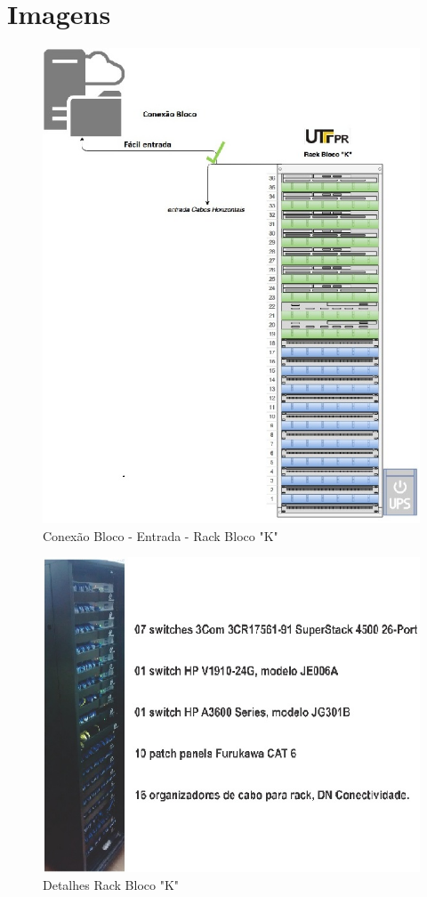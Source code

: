 \documentclass[	DIV=calc,%
							paper=a4,%
							fontsize=12pt,%
							onecolumn]{scrartcl}	 					%
\begin{document}
\section{Imagens}
\begin{figure}[!h]
	\centering
	\caption{Conexão Bloco - Entrada - Rack Bloco "K"}
	\includegraphics{entrada_1}
\end{figure}
\begin{figure}[!h]
	\centering
	\caption{Detalhes Rack Bloco "K"}
	\includegraphics{rack_1}
\end{figure}
\end{document}
